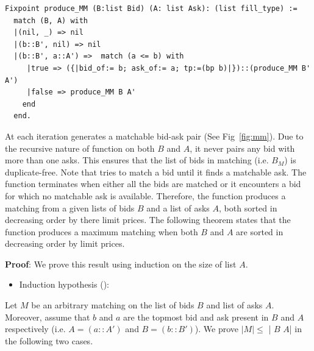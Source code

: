 \documentclass[a4paper,UKenglish,cleveref, autoref]{lipics-v2019}
\begin{document}
\begin{verbatim}
Fixpoint produce_MM (B:list Bid) (A: list Ask): (list fill_type) :=
  match (B, A) with
  |(nil, _) => nil
  |(b::B', nil) => nil              
  |(b::B', a::A') =>  match (a <= b) with
     |true => ({|bid_of:= b; ask_of:= a; tp:=(bp b)|})::(produce_MM B' A')
     |false => produce_MM B A'
    end
  end. 
\end{verbatim}

At each iteration   generates a matchable bid-ask pair (See Fig~\ref{fig:mm}). Due to the recursive nature of  function   on both $B$ and $A$, it never pairs any bid with more than one asks. This ensures that the list of bids in matching (i.e. $B_M$) is duplicate-free. Note that   tries to match a bid until it finds a matchable ask. The function terminates when either all the bids are matched or it encounters a bid for which no matchable ask is available.  Therefore, the function  produces a matching from a given lists of bids $B$ and a list of asks $A$, both sorted in decreasing order by there limit prices.  The following theorem states that the function  produces a maximum matching when both  $B$ and $A$ are sorted in decreasing order by limit prices.
\begin{theorem}
\end{theorem}
\textbf{Proof}: We prove this result using induction on the size of list $A$. 
\begin{itemize}
\item Induction hypothesis (): \emph{  }
\end{itemize}
Let $M$ be an arbitrary matching on the list of bids $B$ and list of asks $A$. Moreover, assume that $b$ and $a$ are the topmost bid and ask present in $B$ and $A$ respectively (i.e. $A = (a::A')$ and $B = (b::B')$). We prove $|M| \leq$ | $B$ $A$| in  the following two cases.
\end{document}
